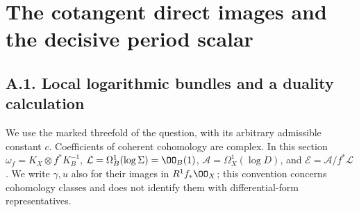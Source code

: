 \section{The cotangent direct images and the decisive period scalar}
\label{inv:sec:partA}

\subsection{A.1. Local logarithmic bundles and a duality calculation}

We use the marked threefold of the question, with its arbitrary admissible
constant $c$.  Coefficients of coherent cohomology are complex.  In this
section $\omega_f=K_X\otimes f^*K_B^{-1}$,
$\mathcal L=\Omega_B^1(\log\Sigma)=\OO_B(1)$,
$\mathcal A=\Omega_X^1(\log D)$, and
$\mathcal E=\mathcal A/f^*\mathcal L$.  We write $\gamma,u$ also for
their images in $R^1f_*\OO_X$; this convention concerns cohomology
classes and does not identify them with differential-form representatives.

